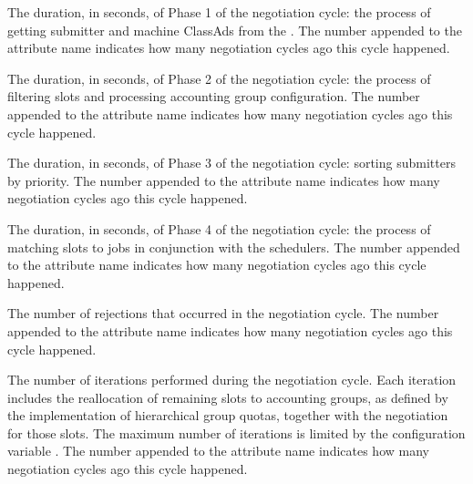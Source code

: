 \begin{description}
\label{attr:LastNegotiationCyclePhase1Duration<X>}
\item[\AdAttr{LastNegotiationCyclePhase1Duration<X>}:] 
The duration, in seconds, of Phase 1 of the negotiation cycle: 
the process of getting submitter and machine ClassAds from the 
.
The number  appended to the attribute name indicates 
how many negotiation cycles ago this cycle happened.

\label{attr:LastNegotiationCyclePhase2Duration<X>}
\item[\AdAttr{LastNegotiationCyclePhase2Duration<X>}:] 
The duration, in seconds, of Phase 2 of the negotiation cycle: 
the process of filtering slots and processing accounting group configuration. 
The number  appended to the attribute name indicates 
how many negotiation cycles ago this cycle happened.

\label{attr:LastNegotiationCyclePhase3Duration<X>}
\item[\AdAttr{LastNegotiationCyclePhase3Duration<X>}:] 
The duration, in seconds, of Phase 3 of the negotiation cycle: 
sorting submitters by priority.  
The number  appended to the attribute name indicates 
how many negotiation cycles ago this cycle happened.

\label{attr:LastNegotiationCyclePhase4Duration<X>}
\item[\AdAttr{LastNegotiationCyclePhase4Duration<X>}:] 
The duration, in seconds, of Phase 4 of the negotiation cycle: 
the process of matching slots to jobs in conjunction with the schedulers. 
The number  appended to the attribute name indicates 
how many negotiation cycles ago this cycle happened.

\label{attr:LastNegotiationCycleRejections<X>}
\item[\AdAttr{LastNegotiationCycleRejections<X>}:] The number of
rejections that occurred in the negotiation cycle.  The number 
appended to the attribute name indicates how many negotiation cycles
ago this cycle happened.

\label{attr:LastNegotiationCycleSlotShareIter<X>}
\item[\AdAttr{LastNegotiationCycleSlotShareIter<X>}:] 
The number of iterations performed during the negotiation cycle.
Each iteration includes the reallocation of remaining slots to 
accounting groups,
as defined by the implementation of hierarchical group quotas, 
together with the negotiation for those slots.
The maximum number of iterations is limited by the configuration variable
.
The number  appended to the attribute name indicates 
how many negotiation cycles ago this cycle happened.


\end{description}
